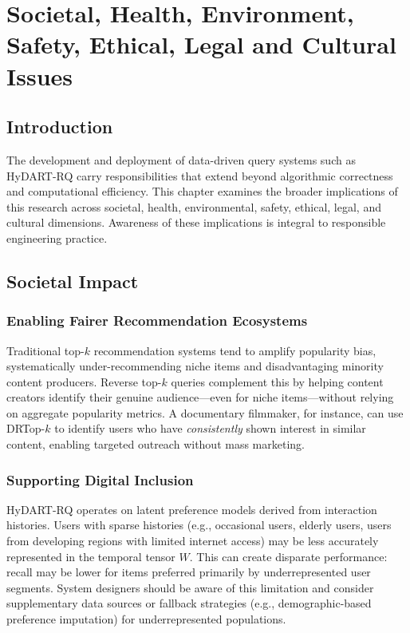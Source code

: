 \chapter{Societal, Health, Environment, Safety, Ethical, Legal and Cultural Issues}
\label{ch:societal}

\section{Introduction}

The development and deployment of data-driven query systems such as HyDART-RQ carry responsibilities that extend beyond algorithmic correctness and computational efficiency. This chapter examines the broader implications of this research across societal, health, environmental, safety, ethical, legal, and cultural dimensions. Awareness of these implications is integral to responsible engineering practice.

\section{Societal Impact}

\subsection{Enabling Fairer Recommendation Ecosystems}

Traditional top-$k$ recommendation systems tend to amplify popularity bias, systematically under-recommending niche items and disadvantaging minority content producers. Reverse top-$k$ queries complement this by helping content creators identify their genuine audience---even for niche items---without relying on aggregate popularity metrics. A documentary filmmaker, for instance, can use DRTop-$k$ to identify users who have \emph{consistently} shown interest in similar content, enabling targeted outreach without mass marketing.

\subsection{Supporting Digital Inclusion}

HyDART-RQ operates on latent preference models derived from interaction histories. Users with sparse histories (e.g., occasional users, elderly users, users from developing regions with limited internet access) may be less accurately represented in the temporal tensor $W$. This can create disparate performance: recall may be lower for items preferred primarily by underrepresented user segments. System designers should be aware of this limitation and consider supplementary data sources or fallback strategies (e.g., demographic-based preference imputation) for underrepresented populations.

